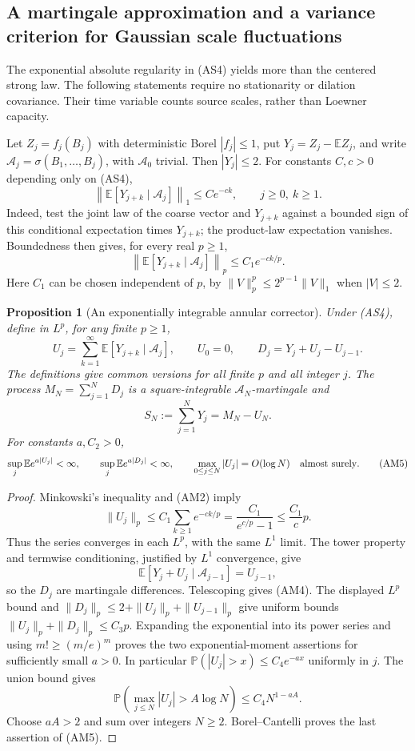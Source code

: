 \documentclass[11pt]{article}
\newtheorem{proposition}[theorem]{Proposition}
\theoremstyle{definition}\newtheorem{definition}[theorem]{Definition}
\theoremstyle{remark}\newtheorem{remark}[theorem]{Remark}
\begin{document}
\subsection{A martingale approximation and a variance criterion for Gaussian scale fluctuations}
\label{sec:annular-martingale}

The exponential absolute regularity in (AS4) yields more than the centered
strong law. The following statements require no stationarity or dilation
covariance. Their time variable counts source scales, rather than Loewner
capacity.

Let $Z_j=f_j(B_j)$ with deterministic Borel $|f_j|\le1$, put
$Y_j=Z_j-\mathbb E Z_j$, and write
$\mathcal A_j=\sigma(B_1,\ldots,B_j)$, with $\mathcal A_0$ trivial.
Then $|Y_j|\le2$. For constants $C,c>0$ depending only on (AS4),
\[
 \left\|\mathbb E[Y_{j+k}\mid\mathcal A_j]\right\|_1
       \le Ce^{-ck},\qquad j\ge0,\ k\ge1.
 \tag{AM1}
\]
Indeed, test the joint law of the coarse vector and $Y_{j+k}$ against
a bounded sign of this conditional expectation times $Y_{j+k}$;
the product-law expectation vanishes. Boundedness then gives, for every
real $p\ge1$,
\[
 \left\|\mathbb E[Y_{j+k}\mid\mathcal A_j]\right\|_p
       \le C_1 e^{-ck/p}.
 \tag{AM2}
\]
Here $C_1$ can be chosen independent of $p$, by
$\|V\|_p^p\le2^{p-1}\|V\|_1$ when $|V|\le2$.

\begin{proposition}[An exponentially integrable annular corrector]
\label{prop:annular-martingale}
Under (AS4), define in $L^p$, for any finite $p\ge1$,
\[
 U_j=\sum_{k=1}^{\infty}\mathbb E[Y_{j+k}\mid\mathcal A_j],
 \qquad U_0=0,
 \qquad D_j=Y_j+U_j-U_{j-1}.
 \tag{AM3}
\]
The definitions give common versions for all finite $p$ and all integer
$j$. The process $M_N=\sum_{j=1}^N D_j$ is a square-integrable
$\mathcal A_N$-martingale and
\[
 S_N:=\sum_{j=1}^N Y_j=M_N-U_N.
 \tag{AM4}
\]
For constants $a,C_2>0$,
\[
 \sup_j\mathbb E e^{a|U_j|}<\infty,
 \qquad \sup_j\mathbb E e^{a|D_j|}<\infty,
 \qquad
 \max_{0\le j\le N}|U_j|=O(\log N)\quad\hbox{almost surely}.
 \tag{AM5}
\]
\end{proposition}
\begin{proof}
Minkowski's inequality and (AM2) imply
\[
 \|U_j\|_p\le C_1\sum_{k\ge1}e^{-ck/p}
      =\frac{C_1}{e^{c/p}-1}\le\frac{C_1}c p.
\]
Thus the series converges in each $L^p$, with the same $L^1$ limit.
The tower property and termwise conditioning, justified by $L^1$
convergence, give
\[
 \mathbb E[Y_j+U_j\mid\mathcal A_{j-1}]=U_{j-1},
\]
so the $D_j$ are martingale differences. Telescoping gives (AM4).
The displayed $L^p$ bound and
$\|D_j\|_p\le2+\|U_j\|_p+\|U_{j-1}\|_p$ give uniform bounds
$\|U_j\|_p+\|D_j\|_p\le C_3p$.
Expanding the exponential into its power series and using
$m!\ge(m/e)^m$ proves the two exponential-moment assertions for
sufficiently small $a>0$. In particular
$\mathbb P(|U_j|>x)\le C_4e^{-ax}$ uniformly in $j$.
The union bound gives
\[
 \mathbb P\left(\max_{j\le N}|U_j|>A\log N\right)
       \le C_4 N^{1-aA}.
\]
Choose $aA>2$ and sum over integers $N\ge2$.
Borel--Cantelli proves the last assertion of (AM5).
\end{proof}
\end{document}
